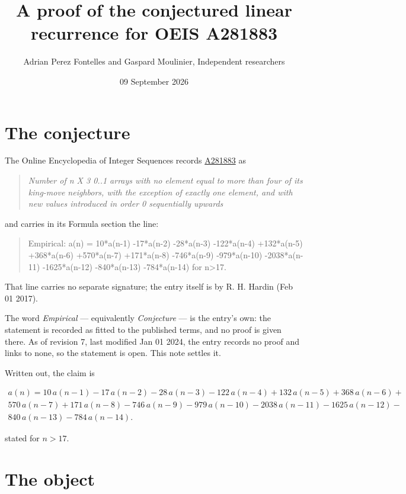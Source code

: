 \documentclass[11pt]{article}
\title{A proof of the conjectured linear recurrence for OEIS A281883}
\author{Adrian Perez Fontelles and Gaspard Moulinier, Independent researchers}
\date{09 September 2026}
\theoremstyle{definition}
\begin{document}
\maketitle
\section{The conjecture}

The Online Encyclopedia of Integer Sequences records \href{https://oeis.org/A281883}{A281883} as

\begin{quote}\itshape Number of n X 3 0..1 arrays with no element equal to more than four of its king-move neighbors, with the exception of exactly one element, and with new values introduced in order 0 sequentially upwards\end{quote}

and carries in its Formula section the line:

\begin{quote}\ttfamily Empirical: a(n) = 10*a(n-1) -17*a(n-2) -28*a(n-3) -122*a(n-4) +132*a(n-5) +368*a(n-6) +570*a(n-7) +171*a(n-8) -746*a(n-9) -979*a(n-10) -2038*a(n-11) -1625*a(n-12) -840*a(n-13) -784*a(n-14) for n>17.\end{quote}

That line carries no separate signature; the entry itself is by R. H. Hardin (Feb 01 2017).

The word {\itshape Empirical} --- equivalently {\itshape Conjecture} --- is the entry's own: the statement is recorded as fitted to the published terms, and no proof is given there. As of revision 7, last modified Jan 01 2024, the entry records no proof and links to none, so the statement is open. This note settles it.

Written out, the claim is

\begin{multline*} a(n) = 10\,a(n-1) - 17\,a(n-2) - 28\,a(n-3) - 122\,a(n-4) + 132\,a(n-5) + 368\,a(n-6) + \\ 570\,a(n-7) + 171\,a(n-8) - 746\,a(n-9) - 979\,a(n-10) - 2038\,a(n-11) - 1625\,a(n-12) - \\ 840\,a(n-13) - 784\,a(n-14). \end{multline*}

stated for $n > 17$.

\section{The object}
\end{document}
